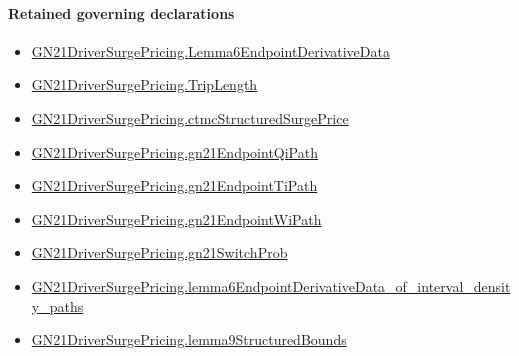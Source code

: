 \documentclass[10pt]{article}
\begin{document}
\paragraph{Retained governing declarations}
\begin{itemize}\raggedright
\item \hyperlink{paper-prerequisite-c788598c55db0e43}{GN21\allowbreak{}Driver\allowbreak{}Surge\allowbreak{}Pricing.\allowbreak{}Lemma6\allowbreak{}Endpoint\allowbreak{}Derivative\allowbreak{}Data}
\item \hyperlink{governing-declaration-a616c143f22cf2bc}{GN21\allowbreak{}Driver\allowbreak{}Surge\allowbreak{}Pricing.\allowbreak{}Trip\allowbreak{}Length}
\item \hyperlink{governing-declaration-15a2877cbcc7c912}{GN21\allowbreak{}Driver\allowbreak{}Surge\allowbreak{}Pricing.\allowbreak{}ctmc\allowbreak{}Structured\allowbreak{}Surge\allowbreak{}Price}
\item \hyperlink{governing-declaration-22bcf97296622d31}{GN21\allowbreak{}Driver\allowbreak{}Surge\allowbreak{}Pricing.\allowbreak{}gn21\allowbreak{}Endpoint\allowbreak{}Qi\allowbreak{}Path}
\item \hyperlink{governing-declaration-55d93f96ff329745}{GN21\allowbreak{}Driver\allowbreak{}Surge\allowbreak{}Pricing.\allowbreak{}gn21\allowbreak{}Endpoint\allowbreak{}Ti\allowbreak{}Path}
\item \hyperlink{governing-declaration-dceaddfe91d03dd1}{GN21\allowbreak{}Driver\allowbreak{}Surge\allowbreak{}Pricing.\allowbreak{}gn21\allowbreak{}Endpoint\allowbreak{}Wi\allowbreak{}Path}
\item \hyperlink{governing-declaration-2506e20884d6eb69}{GN21\allowbreak{}Driver\allowbreak{}Surge\allowbreak{}Pricing.\allowbreak{}gn21\allowbreak{}Switch\allowbreak{}Prob}
\item \hyperlink{governing-declaration-ba9baa90aba5a30b}{GN21\allowbreak{}Driver\allowbreak{}Surge\allowbreak{}Pricing.\allowbreak{}lemma6\allowbreak{}Endpoint\allowbreak{}Derivative\allowbreak{}Data\_\allowbreak{}of\_\allowbreak{}interval\_\allowbreak{}density\_\allowbreak{}paths}
\item \hyperlink{governing-declaration-052a00b858072afc}{GN21\allowbreak{}Driver\allowbreak{}Surge\allowbreak{}Pricing.\allowbreak{}lemma9\allowbreak{}Structured\allowbreak{}Bounds}
\end{itemize}
\end{document}
